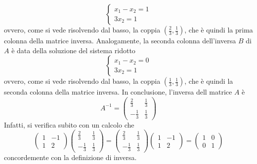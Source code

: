\begin{equation}
  \label{eq:4.32}
  \begin{cases}
    x_1-x_2=1\\
    3x_2=1
  \end{cases}
\end{equation}
ovvero, come si vede risolvendo dal basso, la coppia $\left(\frac{2}{3},\frac{1}{3}\right)$, che è quindi
la prima colonna della matrice inversa. Analogamente, la seconda colonna dell'inversa $B$ di $A$ è data della
soluzione del sistema ridotto
\begin{equation}
  \label{eq:4.33}
  \begin{cases}
    x_1-x_2=0\\
    3x_2=1
  \end{cases}
\end{equation}
ovvero, come si vede risolvendo dal basso, la coppia $\left(\frac{1}{3},\frac{1}{3}\right)$, che è quindi la
seconda colonna della matrice inversa. In conclusione, l'inversa dell matrice $A$ è
\begin{equation*}
  A^{-1}=
  \begin{pmatrix}
    \frac{2}{3} &\frac{1}{3}\\
    -\frac{1}{3} & \frac{1}{3}
  \end{pmatrix}
\end{equation*}
Infatti, si verifica subito con un calcolo che 
\begin{equation*}
  \begin{pmatrix}
    1 & -1\\
    1 & 2
  \end{pmatrix}
  \begin{pmatrix}
     \frac{2}{3} &\frac{1}{3}\\
    -\frac{1}{3} & \frac{1}{3}
  \end{pmatrix}=
   \begin{pmatrix}
     \frac{2}{3} &\frac{1}{3}\\
    -\frac{1}{3} & \frac{1}{3}
   \end{pmatrix}
   \begin{pmatrix}
    1 & -1\\
    1 & 2
   \end{pmatrix}=
   \begin{pmatrix}
     1 &0\\
     0 &1
   \end{pmatrix} 
\end{equation*}
concordemente con la definizione di inversa.\\

